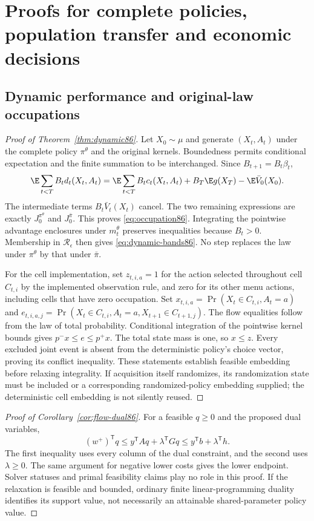 \section{Proofs for complete policies, population transfer and economic decisions}\label{sec:proofs86}
\subsection{Dynamic performance and original-law occupations}
\begin{proof}[Proof of Theorem~\ref{thm:dynamic86}]
Let $X_0\sim\mu$ and generate $(X_t,A_t)$ under the complete policy $\pi^\theta$ and the original kernels. Boundedness permits conditional expectation and the finite summation to be interchanged. Since $B_{t+1}=B_t\beta_t$,
\[
 \E\sum_{t<T}B_td_t(X_t,A_t)
 =\E\sum_{t<T}B_tc_t(X_t,A_t)
   +B_T\E g(X_T)-\E\bar V_0(X_0).
\]
The intermediate terms $B_t\bar V_t(X_t)$ cancel. The two remaining expressions are exactly $J_0^{\pi^\theta}$ and $J_0^{\bar\pi}$. This proves \eqref{eq:occupation86}. Integrating the pointwise advantage enclosures under $m_t^\theta$ preserves inequalities because $B_t>0$. Membership in $\mathcal R_\epsilon$ then gives \eqref{eq:dynamic-bands86}. No step replaces the law under $\pi^\theta$ by that under $\bar\pi$.

For the cell implementation, set $z_{t,i,a}=1$ for the action selected throughout cell $C_{t,i}$ by the implemented observation rule, and zero for its other menu actions, including cells that have zero occupation. Set $x_{t,i,a}=\Pr(X_t\in C_{t,i},A_t=a)$ and $e_{t,i,a,j}=\Pr(X_t\in C_{t,i},A_t=a,X_{t+1}\in C_{t+1,j})$. The flow equalities follow from the law of total probability. Conditional integration of the pointwise kernel bounds gives $p^-x\le e\le p^+x$. The total state mass is one, so $x\le z$. Every excluded joint event is absent from the deterministic policy's choice vector, proving its conflict inequality. These statements establish feasible embedding before relaxing integrality. If acquisition itself randomizes, its randomization state must be included or a corresponding randomized-policy embedding supplied; the deterministic cell embedding is not silently reused.
\end{proof}

\begin{proof}[Proof of Corollary~\ref{cor:flow-dual86}]
For a feasible $q\ge0$ and the proposed dual variables,
\[
 (w^+)^{\mathsf T}q\le y^{\mathsf T}Aq+
 \lambda^{\mathsf T}Gq\le y^{\mathsf T}b+\lambda^{\mathsf T}h.
\]
The first inequality uses every column of the dual constraint, and the second uses $\lambda\ge0$. The same argument for negative lower costs gives the lower endpoint. Solver statuses and primal feasibility claims play no role in this proof. If the relaxation is feasible and bounded, ordinary finite linear-programming duality identifies its support value, not necessarily an attainable shared-parameter policy value.
\end{proof}

